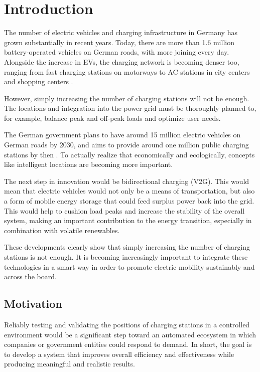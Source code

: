 \section{Introduction}

The number of electric vehicles and charging infrastructure in Germany has grown substantially in recent years. Today, there are more than 1.6 million battery-operated vehicles on German roads, with more joining every day. Alongside the increase in EVs, the charging network is becoming denser too, ranging from fast charging stations on motorways to \ac{AC} stations in city centers and shopping centers \cite{noauthor_elektroauto-statistiken_nodate}. 

However, simply increasing the number of charging stations will not be enough. The locations and integration into the power grid must be thoroughly planned to, for example, balance peak and off-peak loads and optimize user needs.

The German government plans to have around 15 million electric vehicles on German roads by 2030, and aims to provide around one million public charging stations by then \cite{klimaschutz_rahmenbedingungen_nodate}. To actually realize that economically and ecologically, concepts like intelligent locations are becoming more important.

The next step in innovation would be bidirectional charging (\ac{V2G}). This would mean that electric vehicles would not only be a means of transportation, but also a form of mobile energy storage that could feed surplus power back into the grid. This would help to cushion load peaks and increase the stability of the overall system, making an important contribution to the energy transition, especially in combination with volatile renewables.

These developments clearly show that simply increasing the number of charging stations is not enough. It is becoming increasingly important to integrate these technologies in a smart way in order to promote electric mobility sustainably and across the board.

\subsection{Motivation}
Reliably testing and validating the positions of charging stations in a controlled environment would be a significant step toward an automated ecosystem in which companies or government entities could respond to demand. In short, the goal is to develop a system that improves overall efficiency and effectiveness while producing meaningful and realistic results.

